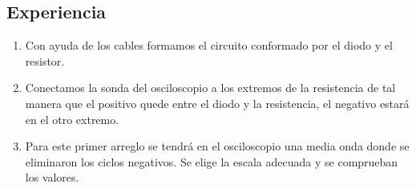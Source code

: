 \documentclass[a4paper,12pt]{report}
\begin{document}
\subsection{Experiencia}
\begin{enumerate}
\item Con ayuda de los cables formamos el circuito conformado por el diodo y el resistor.
\item Conectamos la sonda del osciloscopio a los extremos de la resistencia de tal manera que el positivo quede entre el diodo y la resistencia, el negativo estará en el otro extremo.
\item Para este primer arreglo se tendrá en el osciloscopio una media onda donde se eliminaron los ciclos negativos. Se elige la escala adecuada y se comprueban los valores.
\end{enumerate}
\end{document}
